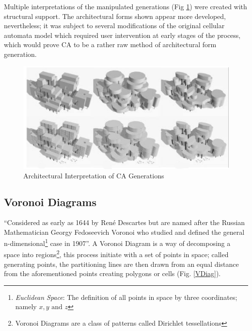 Multiple interpretations of the manipulated generations (Fig \ref{CA ArchForm}) were created with structural support. The architectural forms shown appear more developed, nevertheless; it was subject to several modifications of the original cellular automata model which required user intervention at early stages of the process, which would prove CA to be a rather raw method of architectural form generation.

\begin{figure}[htbp]
\centering
\includegraphics[width=\textwidth]{./Images/5-3dCASpaces}
\caption[Architectural Interpretation of CA Generations]{Architectural Interpretation of CA Generations \cite{krawczyk02}}
\label{CA ArchForm}
\end{figure}

\clearpage
\subsection{Voronoi Diagrams}

``Considered as early as 1644 by Ren\'{e} Descartes but are named after the Russian Mathematician Georgy Fedoseevich Voronoi who studied and defined the general n-dimensional\footnote{\emph{Euclidean Space}: The definition of all points in space by three coordinates; namely $x,y \text{ and } z$} case in 1907''\cite{fasoulaki08}. A Voronoi Diagram is a way of decomposing a space into regions\footnote{Voronoi Diagrams are a class of patterns called Dirichlet tessellations}, this process initiate with a set of points in space; called generating points, the partitioning lines are then drawn from an equal distance from the aforementioned points creating polygons or cells (Fig. \ref{VDiag}).

